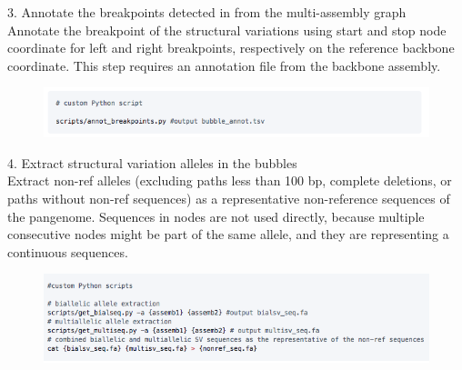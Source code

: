 \documentclass[../main.tex]{subfiles}
\begin{document}
\begin{flushleft}
\newpage

3. Annotate the breakpoints detected in from the multi-assembly graph \\ Annotate the breakpoint of the structural variations using start and stop node coordinate for left and right breakpoints, respectively on the reference backbone coordinate. This step requires an annotation file from the backbone assembly. \\ 
\begin{figure}[!htb]
    \centering
    \includegraphics[width=\textwidth]{paper3/supplement/sp431.png}
\end{figure}

4. Extract structural variation alleles in the bubbles \\ Extract non-ref alleles (excluding paths less than 100 bp, complete deletions, or paths without non-ref sequences) as a representative non-reference sequences of the pangenome. Sequences in nodes are not used directly, because multiple consecutive nodes might be part of the same allele, and they are representing a continuous sequences. \\ 
\begin{figure}[!htb]
    \centering
    \includegraphics[width=\textwidth]{paper3/supplement/sp432.png}
\end{figure}


\singlespacing
\footnotesize
\renewcommand{\bibname}{Supplementary References}






\end{flushleft}

\ifdefined\BuildingFromMainFile
\else
   
\end{document}
